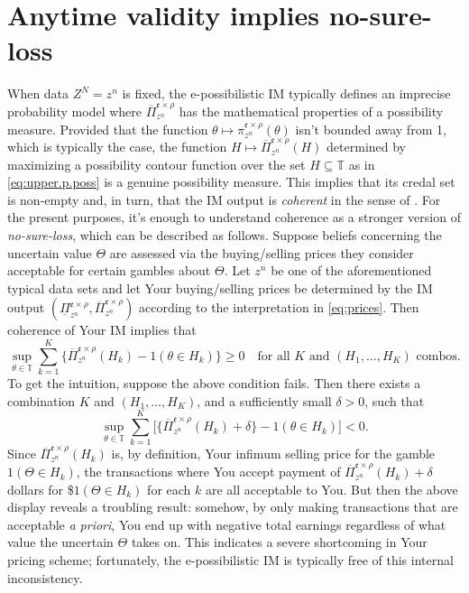 \documentclass[a4paper, 12pt]{article}
\theoremstyle{plain}
\theoremstyle{definition}
\theoremstyle{remark}
\newcommand{\TT}{\mathbb{T}}
\newcommand{\lPi}{\underline{\Pi}}
\newcommand{\uPi}{\overline{\Pi}}
\newcommand{\eval}{\mathfrak{e}}
\begin{document}
\section{Anytime validity implies no-sure-loss}
\label{S:euq.coherence}

When data $Z^N=z^n$ is fixed, the e-possibilistic IM typically defines an  imprecise probability model where $\uPi_{z^n}^{\eval \times \rho}$ has the mathematical properties of a possibility measure.  Provided that the function $\theta \mapsto \pi_{z^n}^{\eval \times \rho}(\theta)$ isn't bounded away from 1, which is typically the case, the function $H \mapsto \uPi_{z^n}^{\eval \times \rho}(H)$ determined by maximizing a possibility contour function over the set $H \subseteq \TT$ as in \eqref{eq:upper.p.poss} is a genuine possibility measure.  This implies that its credal set is non-empty and, in turn, that the IM output is {\em coherent} in the sense of \citet[][Sec.~2.5]{walley1991}.  For the present purposes, it's enough to understand coherence as a stronger version of {\em no-sure-loss}, which can be described as follows. Suppose beliefs concerning the uncertain value $\Theta$ are assessed via the buying/selling prices they consider acceptable for certain gambles about $\Theta$.  Let $z^n$ be one of the aforementioned typical data sets and let Your buying/selling prices be determined by the IM output $(\lPi_{z^n}^{\eval \times \rho}, \uPi_{z^n}^{\eval \times \rho})$ according to the interpretation in \eqref{eq:prices}.  Then coherence of Your IM implies that
\[ \sup_{\theta \in \TT} \sum_{k=1}^K \{ \uPi_{z^n}^{\eval \times \rho}(H_k) - 1(\theta \in H_k)\} \geq 0 \quad \text{for all $K$ and $(H_1,\ldots,H_K)$ combos}. \] 
To get the intuition, suppose the above condition fails.  Then there exists a combination $K$ and $(H_1,\ldots,H_K)$, and a sufficiently small $\delta > 0$, such that 
\[ \sup_{\theta \in \TT} \sum_{k=1}^K \bigl[ \{ \uPi_{z^n}^{\eval \times \rho}(H_k) + \delta\} - 1(\theta \in H_k) \bigr] < 0. \]
Since $\uPi_{z^n}^{\eval \times \rho}(H_k)$ is, by definition, Your infimum selling price for the gamble $1(\Theta \in H_k)$, the transactions where You accept payment of $\uPi_{z^n}^{\eval \times \rho}(H_k) + \delta$ dollars for \$$1(\Theta \in H_k)$ for each $k$ are all acceptable to You.  But then the above display reveals a troubling result: somehow, by only making transactions that are acceptable {\em a priori}, You end up with negative total earnings regardless of what value the uncertain $\Theta$ takes on.  This indicates a severe shortcoming in Your pricing scheme; fortunately, the e-possibilistic IM is typically free of this internal inconsistency.  
\end{document}

